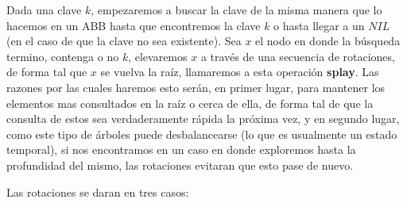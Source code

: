 Dada una clave $k$, empezaremos a buscar la clave de la misma manera que lo hacemos en un ABB hasta que encontremos la clave $k$ o hasta llegar a un $NIL$ (en el caso de que la clave no sea existente). Sea $x$ el nodo en donde la b\'usqueda termino, contenga o no $k$, elevaremos $x$ a trav\'es de una secuencia de rotaciones, de forma tal que $x$ se vuelva la ra\'iz, llamaremos a esta operaci\'on \textbf{splay}. Las razones por las cuales haremos esto ser\'an, en primer lugar, para mantener los elementos mas consultados en la ra\'iz o cerca de ella, de forma tal de que la consulta de estos sea verdaderamente r\'apida la pr\'oxima vez, y en segundo lugar, como este tipo de \'arboles puede desbalancearse (lo que es usualmente un estado temporal), si nos encontramos en un caso en donde exploremos hasta la profundidad del mismo, las rotaciones evitaran que esto pase de nuevo.

\newpage

Las rotaciones se daran en tres casos:

